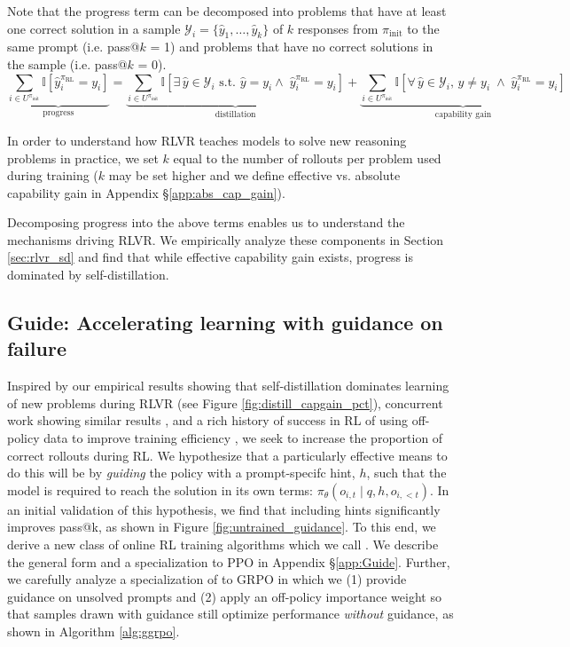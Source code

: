 \documentclass{article}
\begin{document}
Note that the progress term can be decomposed into problems that have at least one correct solution in a sample
$ \mathcal{Y}_i = \{ \hat{y}_1, \dots, \hat{y}_k \}$
of $k$ responses from $\pi_{\text{init}}$ to the same prompt (i.e. pass@$k$ = 1) and problems that have no correct solutions in the sample (i.e. pass@$k$ = 0).
\begin{equation}
\underbrace{\sum_{i \in U^{\pi_{\text{init}}}} \mathbb{I}[\hat{y}_i^{\pi_{\text{RL}}} = y_i]}_{\text{progress}} 
=
\underbrace{\sum_{i \in U^{\pi_{\text{init}}}} \mathbb{I}\left[\exists\, \hat{y} \in \mathcal{Y}_i \text{ s.t. } \hat{y} = y_i \land\; \hat{y}_i^{\pi_{\text{RL}}} = y_i\right]}_{\text{distillation}} 
+
\underbrace{\sum_{i \in U^{\pi_{\text{init}}}} \mathbb{I}\left[\forall\, \hat{y} \in \mathcal{Y}_i,\, \hat{y} \neq y_i \;\land\; \hat{y}_i^{\pi_{\text{RL}}} = y_i\right]}_{\text{capability gain}}
\label{eq:progress}
\end{equation}

In order to understand how RLVR teaches models to solve new reasoning problems in practice, we set $k$ equal to the number of rollouts per problem used during training ($k$ may be set higher and we define effective vs. absolute capability gain in Appendix \S\ref{app:abs_cap_gain}).

Decomposing progress into the above terms enables us to understand the mechanisms driving RLVR. We empirically analyze these components in Section \ref{sec:rlvr_sd} and find that while effective capability gain exists, progress is dominated by self-distillation.

\subsection{Guide: Accelerating learning with guidance on failure}
Inspired by our empirical results showing that self-distillation dominates learning of new problems during RLVR (see Figure \ref{fig:distill_capgain_pct}), concurrent work showing similar results \cite{yue2025does}, and a rich history of success in RL of using off-policy data to improve training efficiency \cite{lillicrap2015continuous}, we seek to increase the proportion of correct rollouts during RL. We hypothesize that a particularly effective means to do this will be by \textit{guiding} the policy with a prompt-specifc hint, $h$, such that the model is required to reach the solution in its own terms: $\pi_\theta(o_{i,t} \mid q, h, o_{i,<t})$. In an initial validation of this hypothesis, we find that including hints significantly improves pass@k, as shown in Figure \ref{fig:untrained_guidance}.
To this end, we derive a new class of online RL training algorithms which we call . We describe the general form and a specialization to PPO in Appendix \S \ref{app:Guide}. Further, we carefully analyze a specialization of  to GRPO in which we (1) provide guidance on unsolved prompts and (2) apply an off-policy importance weight
so that samples drawn with guidance still optimize performance \emph{without}
guidance, as shown in Algorithm \ref{alg:ggrpo}.
\end{document}
